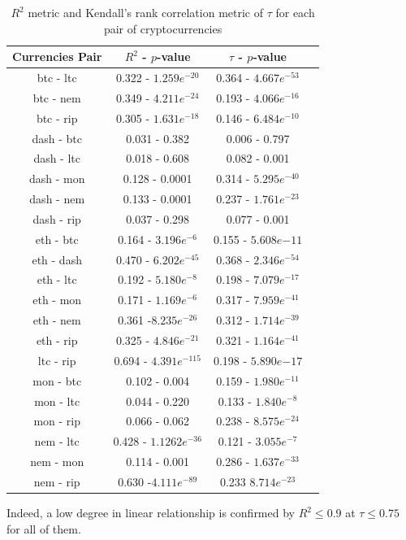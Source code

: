\documentclass[12pt,twoside]{article}
\newcommand{\head}[1]{\textnormal{\textbf{#1}}}
\begin{document}
\begin{table}[H]
\begin{tabular}{cccc}
\hline
\head{Currencies Pair} & \head{$R^2$ - $p$-value} & \head{$\tau$ - $p$-value} \\
\hline
btc - ltc & 0.322 - $1.259e^{-20}$ & 0.364 - $4.667e^{-53}$\\
btc - nem & 0.349 - $4.211e^{-24}$ & 0.193 - $4.066e^{-16}$\\
btc - rip & 0.305 - $1.631e^{-18}$ & 0.146 - $6.484e^{-10}$\\
dash - btc & 0.031 - 0.382 & 0.006 - 0.797\\
dash - ltc & 0.018 - 0.608 & 0.082 - 0.001\\
dash - mon & 0.128 - 0.0001 & 0.314 - $5.295e^{-40}$\\
dash - nem & 0.133 - 0.0001 & 0.237 - $1.761e^{-23}$\\
dash - rip & 0.037 - 0.298 & 0.077 - 0.001\\
eth - btc & 0.164 - $3.196e^{-6}$ & 0.155 - $5.608e{-11}$\\
eth - dash & 0.470 - $6.202e^{-45}$ & 0.368 - $2.346e^{-54}$\\
eth - ltc & 0.192 - $5.180e^{-8}$ & 0.198 - $7.079e^{-17}$\\
eth - mon & 0.171 - $1.169e^{-6}$ & 0.317 - $7.959e^{-41}$\\
eth - nem & 0.361 -$8.235e^{-26}$ & 0.312 - $1.714e^{-39}$\\
eth - rip & 0.325 - $4.846e^{-21}$ & 0.321 - $1.164e^{-41}$\\
ltc - rip & 0.694 - $4.391e^{-115}$ & 0.198 - $5.890e{-17}$\\
mon - btc & 0.102 - 0.004 & 0.159 - $1.980e^{-11}$\\
mon - ltc & 0.044 - 0.220 & 0.133 - $1.840e^{-8}$\\
mon - rip & 0.066 - 0.062 & 0.238 - $8.575e^{-24}$\\
nem - ltc & 0.428 - $1.1262e^{-36}$ & 0.121 - $3.055e^{-7}$\\
nem - mon & 0.114 - 0.001  & 0.286 - $1.637e^{-33}$\\
nem - rip & 0.630 -$4.111e^{-89}$ & 0.233 $8.714e^{-23}$\\
\hline
\end{tabular}
\caption{$R^2$ metric and Kendall's rank correlation metric of $\tau$ for each pair of cryptocurrencies}
\end{table}


\bigbreak
Indeed, a low degree in linear relationship is confirmed by $R^2 \leq 0.9$ at $\tau \leq 0.75$ for all of them.
\bigbreak
\end{document}

